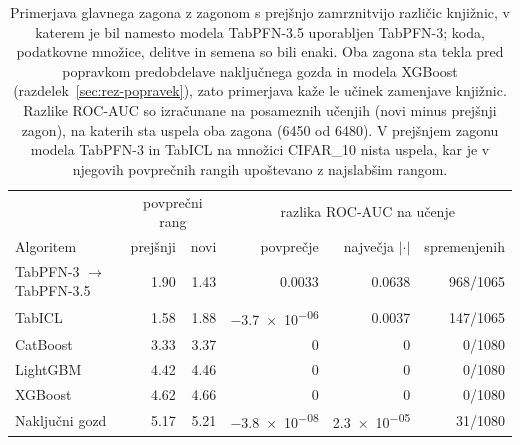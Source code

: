\begin{table}[htbp]
\centering
\caption{Primerjava glavnega zagona z zagonom s prejšnjo zamrznitvijo različic knjižnic, v katerem je bil namesto modela TabPFN-3.5 uporabljen TabPFN-3; koda, podatkovne množice, delitve in semena so bili enaki. Oba zagona sta tekla pred popravkom predobdelave naključnega gozda in modela XGBoost (razdelek~\ref{sec:rez-popravek}), zato primerjava kaže le učinek zamenjave knjižnic. Razlike ROC-AUC so izračunane na posameznih učenjih (novi minus prejšnji zagon), na katerih sta uspela oba zagona (6450 od 6480). V prejšnjem zagonu modela TabPFN-3 in TabICL na množici CIFAR\_10 nista uspela, kar je v njegovih povprečnih rangih upoštevano z najslabšim rangom.}
\label{tab:zagona}
\footnotesize
\setlength{\tabcolsep}{4pt}
\begin{tabular}{lrrrrr}
\hline
 & \multicolumn{2}{c}{povprečni rang} & \multicolumn{3}{c}{razlika ROC-AUC na učenje} \\
Algoritem & prejšnji & novi & povprečje & največja $|\cdot|$ & spremenjenih \\
\hline
TabPFN-3 $\rightarrow$ TabPFN-3.5 & \num{1.90} & \num{1.43} & \num{0.0033} & \num{0.0638} & 968/1065 \\
TabICL & \num{1.58} & \num{1.88} & \num{-3.7e-06} & \num{0.0037} & 147/1065 \\
CatBoost & \num{3.33} & \num{3.37} & 0 & 0 & 0/1080 \\
LightGBM & \num{4.42} & \num{4.46} & 0 & 0 & 0/1080 \\
XGBoost & \num{4.62} & \num{4.66} & 0 & 0 & 0/1080 \\
Naključni gozd & \num{5.17} & \num{5.21} & \num{-3.8e-08} & \num{2.3e-05} & 31/1080 \\
\hline
\end{tabular}
\end{table}
